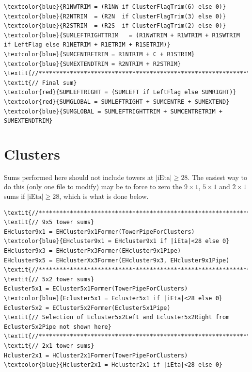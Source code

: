 \documentclass[a4paper, 12pt]{article}
\begin{document}
\begin{Verbatim}[label={EG cluster energy sums}]
\textcolor{blue}{R1NWTRIM = (R1NW if ClusterFlagTrim(6) else 0)}
\textcolor{blue}{R2NTRIM  = (R2N  if ClusterFlagTrim(3) else 0)}
\textcolor{blue}{R2STRIM  = (R2S  if ClusterFlagTrim(2) else 0)}
\textcolor{blue}{SUMLEFTRIGHTTRIM   = (R1NWTRIM + R1WTRIM + R1SWTRIM if LeftFlag else R1NETRIM + R1ETRIM + R1SETRIM)}
\textcolor{blue}{SUMCENTRETRIM = R1NTRIM + C + R1STRIM}
\textcolor{blue}{SUMEXTENDTRIM = R2NTRIM + R2STRIM}
\textit{//******************************************************************//}
\textit{// Final sum}
\textcolor{red}{SUMLEFTRIGHT = (SUMLEFT if LeftFlag else SUMRIGHT)}
\textcolor{red}{SUMGLOBAL = SUMLEFTRIGHT + SUMCENTRE + SUMEXTEND}
\textcolor{blue}{SUMGLOBAL = SUMLEFTRIGHTTRIM + SUMCENTRETRIM + SUMEXTENDTRIM}
\end{Verbatim}

\section{Clusters}
Sums performed here should not include towers at $|\textrm{iEta}|\geq28$. The easiest way to do this (only one file to modify) may be to force to zero the $9\times1$, $5\times1$ and $2\times1$ sums if $|\textrm{iEta}|\geq28$, which is what is done below.

\begin{Verbatim}[label={Isolation energy sums}]
\textit{//******************************************************************//}
\textit{// 9x5 tower sums}
EHcluster9x1 = EHCluster9x1Former(TowerPipeForClusters)
\textcolor{blue}{EHcluster9x1 = EHcluster9x1 if |iEta|<28 else 0}
EHcluster9x3 = EHclusterPx3Former(EHcluster9x1Pipe)
EHcluster9x5 = EHclusterXx3Former(EHcluster9x3, EHcluster9x1Pipe)
\textit{//******************************************************************//}
\textit{// 5x2 tower sums}
Ecluster5x1 = ECluster5x1Former(TowerPipeForClusters)
\textcolor{blue}{Ecluster5x1 = Ecluster5x1 if |iEta|<28 else 0}
Ecluster5x2 = ECluster5x2Former(Ecluster5x1Pipe)
\textit{// Selection of Ecluster5x2Left and Ecluster5x2Right from Ecluster5x2Pipe not shown here}
\textit{//******************************************************************//}
\textit{// 2x1 tower sums}
Hcluster2x1 = HCluster2x1Former(TowerPipeForClusters)
\textcolor{blue}{Hcluster2x1 = Hcluster2x1 if |iEta|<28 else 0}
\end{Verbatim}
\end{document}
